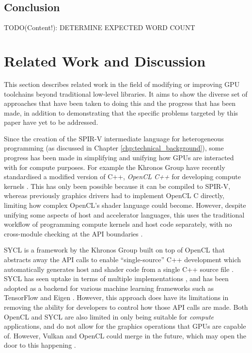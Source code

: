 \documentclass[a4paper,12pt,twoside,openright]{report}
\begin{document}
\section{Conclusion}

TODO(Content!): DETERMINE EXPECTED WORD COUNT

\chapter{Related Work and Discussion}



\label{chp:related_work}

This section describes related work in the field of modifying or improving GPU
toolchains beyond traditional low-level libraries. It aims to show the diverse
set of approaches that have been taken to doing this and the progress that has
been made, in addition to demonstrating that the specific problems targeted by
this paper have yet to be addressed.

Since the creation of the SPIR-V intermediate language for heterogeneous
programming (as discussed in Chapter \ref{chp:technical_background}), some
progress has been made in simplifying and unifying how GPUs are interacted with
for compute purposes. For example the Khronos Group have recently standardised
a modified version of C++, \textit{OpenCL C++} for developing compute kernels
\cite{OpenCL22Release} \cite{OpenCLCPPWhitePaper} \cite{OpenCL}. This has only
been possible because it can be compiled to SPIR-V, whereas previously graphics
drivers had to implement OpenCL C directly, limiting how complex OpenCL's
shader language could become. However, despite unifying some aspects of host
and accelerator languages, this uses the traditional workflow of programming
compute kernels and host code separately, with no cross-module checking at the
API boundaries \cite{OpenCL22Release}.

SYCL is a framework by the Khronos Group built on top of OpenCL that abstracts
away the API calls to enable ``single-source'' C++ development which
automatically generates host and shader code from a single C++ source file
\cite{OpenCL22Release} \cite{SYCL}. SYCL has seen uptake in terms of multiple
implementations \cite{ComputeCPP} \cite{triSYCL}, and has been adopted as a
backend for various machine learning frameworks such as TensorFlow and Eigen
\cite{SYCLTensorFlow} \cite{SYCLEigen}. However, this approach does have its
limitations in removing the ability for developers to control how those API
calls are made. Both OpenCL and SYCL are also limited in only being suitable
for \textit{compute} applications, and do not allow for the graphics operations
that GPUs are capable of. However, Vulkan and OpenCL could merge in the future,
which may open the door to this happening \cite{VulkanOpenCLMerge}.
\end{document}
